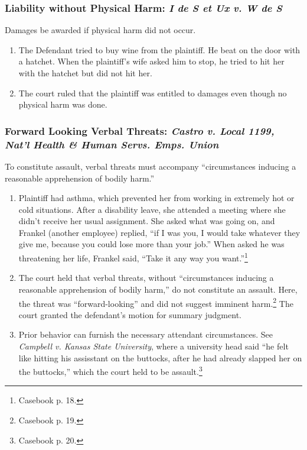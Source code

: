 \subsubsection{Liability without Physical Harm: \emph{I de S et Ux v. W de S}}

Damages be awarded if physical harm did not occur. 

\begin{enumerate}
    \item The Defendant tried to buy wine from the plaintiff. He beat on the 
    door with a hatchet. When the plaintiff's wife asked him to stop, he tried 
    to hit her with the hatchet but did not hit her.
    \item The court ruled that the plaintiff was entitled to damages even 
    though no physical harm was done.
\end{enumerate}
    
\subsubsection{Forward Looking Verbal Threats: \emph{Castro v. Local 1199, 
Nat'l Health \& Human Servs. Emps. Union}}

To constitute assault, verbal threats must accompany ``circumstances inducing 
a reasonable apprehension of bodily harm.''

\begin{enumerate}
    \item Plaintiff had asthma, which prevented her from working in extremely 
    hot or cold situations. After a disability leave, she attended a meeting 
    where she didn't receive her usual assignment. She asked what was going 
    on, and Frankel (another employee) replied, ``if I was you, I would take 
    whatever they give me, because you could lose more than your job.'' When 
    asked he was threatening her life, Frankel said, ``Take it any way you 
    want.''\footnote{Casebook p. 18.}
    \item The court held that verbal threats, without ``circumstances inducing 
    a reasonable apprehension of bodily harm,'' do not constitute an assault. 
    Here, the threat was ``forward-looking'' and did not suggest imminent 
    harm.\footnote{Casebook p. 19.} The court granted the defendant's motion 
    for summary judgment.
    \item Prior behavior can furnish the necessary attendant circumstances.  
    See \emph{Campbell v. Kansas State University}, where a university head 
    said ``he felt like hitting his assisstant on the buttocks, after he had 
    already slapped her on the buttocks,'' which the court held to be 
    assault.\footnote{Casebook p. 20.}
\end{enumerate}


